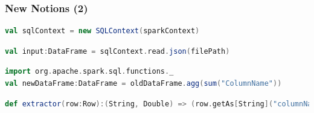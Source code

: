 \documentclass[slidetop,9pt,utf8]{beamer}
\begin{document}
\begin{frame}[fragile]
  \frametitle{New Notions (2)}

  \begin{lstlisting}[label=SqlContextInitialization, caption=Init Spark SQL Context, language=scala, style=code]
val sqlContext = new SQLContext(sparkContext)
  \end{lstlisting}

  \begin{lstlisting}[label=JsonFileLoading, caption=Load a DataFrame from JSON file, language=scala, style=code]
val input:DataFrame = sqlContext.read.json(filePath)
  \end{lstlisting}

  \begin{lstlisting}[label=AggregationByFunction, caption=Aggregation by a SQL Function, language=scala, style=code]
import org.apache.spark.sql.functions._
val newDataFrame:DataFrame = oldDataFrame.agg(sum("ColumnName"))
  \end{lstlisting}

  \begin{lstlisting}[label=ExtractValueFromARow, caption=Extract value from a Row, language=scala, style=code]
def extractor(row:Row):(String, Double) => (row.getAs[String]("columnName1"), row.getAs[Double]("columnName2")))
  \end{lstlisting}

\end{frame}
\end{document}
